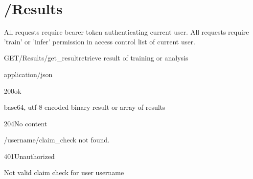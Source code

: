 \documentclass[12pt, etter]{article}
\begin{document}
\section{/Results}
All requests require bearer token authenticating current user.
All requests require 'train' or 'infer' permission in access control list of current user.

\begin{apiRoute}{GET}{/Results/get\_result}{retrieve result of training or analysis}
    \begin{routeParameter}
    \end{routeParameter}
    \begin{routeResponse}{application/json}
        \begin{routeResponseItem}{200}{ok}
            \begin{routeResponseItemBody}
                base64, utf-8 encoded binary result or array of results
            \end{routeResponseItemBody}
        \end{routeResponseItem}
        \begin{routeResponseItem}{204}{No content}
            \begin{routeResponseItemBody}
                /{username}/{claim_check} not found.
            \end{routeResponseItemBody}
        \end{routeResponseItem}
        \begin{routeResponseItem}{401}{Unauthorized}
            \begin{routeResponseItemBody}
                Not valid claim check for user {username}
            \end{routeResponseItemBody}
        \end{routeResponseItem}
    \end{routeResponse}
\end{apiRoute}
\end{document}
